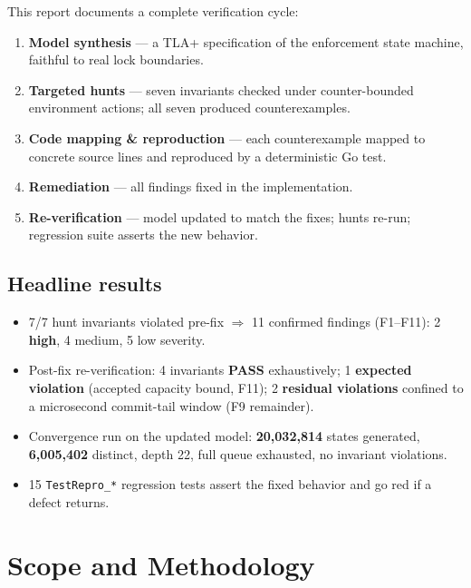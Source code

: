 \documentclass[11pt]{article}
\newcommand{\code}[1]{\texttt{#1}}
\newcommand{\sev}[1]{\textbf{#1}}
\begin{document}
This report documents a complete verification cycle:

\begin{enumerate}[nosep]
  \item \textbf{Model synthesis} — a TLA+ specification of the enforcement
        state machine, faithful to real lock boundaries.
  \item \textbf{Targeted hunts} — seven invariants checked under
        counter-bounded environment actions; all seven produced counterexamples.
  \item \textbf{Code mapping \& reproduction} — each counterexample mapped to
        concrete source lines and reproduced by a deterministic Go test.
  \item \textbf{Remediation} — all findings fixed in the implementation.
  \item \textbf{Re-verification} — model updated to match the fixes; hunts
        re-run; regression suite asserts the new behavior.
\end{enumerate}

\subsection*{Headline results}

\begin{itemize}[nosep]
  \item 7/7 hunt invariants violated pre-fix $\Rightarrow$ 11 confirmed
        findings (F1--F11): 2 \sev{high}, 4 medium, 5 low severity.
  \item Post-fix re-verification: 4 invariants \textbf{PASS} exhaustively;
        1 \textbf{expected violation} (accepted capacity bound, F11);
        2 \textbf{residual violations} confined to a microsecond commit-tail
        window (F9 remainder).
  \item Convergence run on the updated model: \textbf{20{,}032{,}814} states
        generated, \textbf{6{,}005{,}402} distinct, depth 22, full queue
        exhausted, no invariant violations.
  \item 15 \code{TestRepro\_*} regression tests assert the fixed behavior and
        go red if a defect returns.
\end{itemize}

\section{Scope and Methodology}
\end{document}
